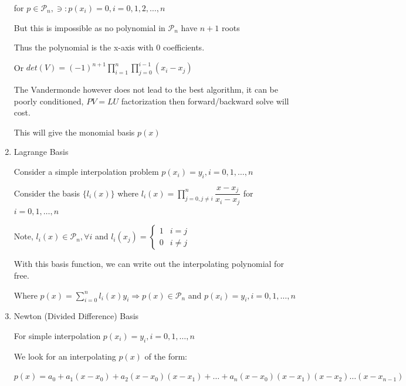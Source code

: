 \documentclass{article}
\begin{document}
\begin{enumerate}
    for $p \in \mathcal{P}_n, \ni: p(x_i) = 0, i = 0, 1, 2, \dots ,n$
    
    But this is impossible as no polynomial in $\mathcal{P}_n$ have $n + 1$ roots
    
    Thus the polynomial is the x-axis with 0 coefficients.
    
    \vspace{0.2cm}
    
    Or $det(V) = (-1)^{n + 1} \displaystyle \prod_{i = 1}^n \prod_{j = 0}^{i - 1} (x_i - x_j)$

    The Vandermonde however does not lead to the best algorithm, it can be poorly conditioned, $PV = LU$ factorization then forward/backward solve will cost.
    
    This will give the monomial basis $p(x)$
    
    \item Lagrange Basis
    
    Consider a simple interpolation problem $p(x_i) = y_i, i = 0, 1, \dots , n$
    
    Consider the basis $\{ l_i(x) \}$ where $l_i(x) = \displaystyle \prod_{j = 0, j \neq i}^n \dfrac{x - x_j}{x_i - x_j}$ for $i = 0, 1, \dots ,n$
    
    Note, $l_i(x) \in \mathcal{P}_n, \forall i$ and $l_{i} ( x_j) = \begin{cases}
    1 & i = j\\
    0 & i \neq j
    \end{cases}$
    
    With this basis function, we can write out the interpolating polynomial for free. 
    
    Where $p(x) = \displaystyle \sum_{i = 0}^n l_i(x)y_i \Rightarrow p(x) \in \mathcal{P}_n$ and $p(x_i) = y_i, i = 0, 1, \dots, n$
    
    \item Newton (Divided Difference) Basis
    
    For simple interpolation $p(x_i) = y_i, i = 0, 1, \dots ,n$
    
    We look for an interpolating $p(x)$ of the form:
    
    $p(x) = a_0 + a_1 (x - x_0) + a_2 ( x - x_0)(x - x_1) + \dots + a_n(x - x_0)(x - x_1)(x - x_2) \dots (x - x_{n - 1})$
    

\end{enumerate}
\end{document}
